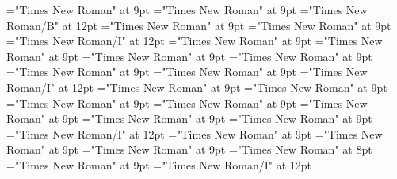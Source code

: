 \documentclass[gps1,twoside]{article}
\begin{document}
\font\spansensecontentsensessubentrysubentriesentrybefore="Times New Roman" at 9pt
\font\sensessubentrysubentriesentryafter="Times New Roman" at 9pt
\font\sensenumbersensecontentsensessubentrysubentriesentry="Times New Roman/B" at 12pt
\font\sensenumbersensecontentsensessubentrysubentriesentryafter="Times New Roman" at 9pt
\font\morphosyntaxanalysissharedgrammaticalinfosensessubentrysubentriesentryafter="Times New Roman" at 9pt
\font\morphosyntaxanalysissharedgrammaticalinfosensessubentrysubentriesentry="Times New Roman/I" at 12pt
\font\partofspeechmorphosyntaxanalysissharedgrammaticalinfosensessubentrysubentriesentrybefore="Times New Roman" at 9pt
\font\spanpartofspeechmorphosyntaxanalysissharedgrammaticalinfosensessubentrysubentriesentrylastchildafter="Times New Roman" at 9pt
\font\slotsmorphosyntaxanalysissharedgrammaticalinfosensessubentrysubentriesentrybefore="Times New Roman" at 9pt
\font\nameslotslotsmorphosyntaxanalysissharedgrammaticalinfosensessubentrysubentriesentrybefore="Times New Roman" at 9pt
\font\spannameslotslotsmorphosyntaxanalysissharedgrammaticalinfosensessubentrysubentriesentrylastchildafter="Times New Roman" at 9pt
\font\morphosyntaxanalysissensesensessubentrysubentriesentryafter="Times New Roman" at 9pt
\font\morphosyntaxanalysissensesensessubentrysubentriesentry="Times New Roman/I" at 12pt
\font\partofspeechmorphosyntaxanalysissensesensessubentrysubentriesentrybefore="Times New Roman" at 9pt
\font\spanpartofspeechmorphosyntaxanalysissensesensessubentrysubentriesentrylastchildafter="Times New Roman" at 9pt
\font\slotsmorphosyntaxanalysissensesensessubentrysubentriesentrybefore="Times New Roman" at 9pt
\font\nameslotslotsmorphosyntaxanalysissensesensessubentrysubentriesentrybefore="Times New Roman" at 9pt
\font\spannameslotslotsmorphosyntaxanalysissensesensessubentrysubentriesentrylastchildafter="Times New Roman" at 9pt
\font\sensetypesensesensessubentrysubentriesentrybefore="Times New Roman" at 9pt
\font\sensetypesensesensessubentrysubentriesentryafter="Times New Roman" at 9pt
\font\sensetypesensesensessubentrysubentriesentry="Times New Roman/I" at 12pt
\font\abbreviationsensetypesensesensessubentrysubentriesentrybefore="Times New Roman" at 9pt
\font{}="Times New Roman" at 9pt
\font\spandefinitionorglosssensesensessubentrysubentriesentrylastchildafter="Times New Roman" at 9pt
\font\exampleexampleexamplessensesensessubentrysubentriesentrybefore="Times New Roman" at 8pt
\font\examplessensesensessubentrysubentriesentryafter="Times New Roman" at 9pt
\font\spanbzhexampleexampleexamplessensesensessubentrysubentriesentry="Times New Roman/I" at 12pt
\end{document}
